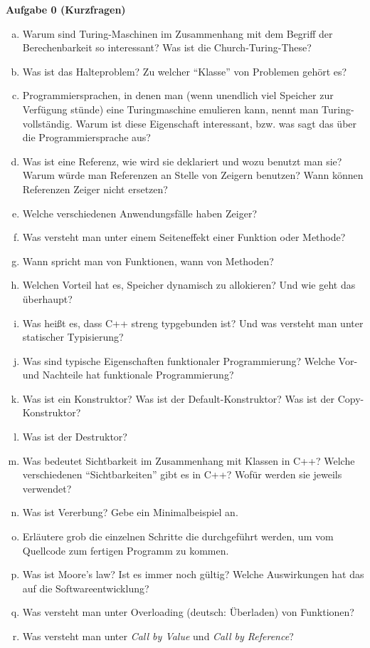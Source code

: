 \documentclass[a4paper,12pt]{article}
\newcommand{\Aufgabe}[1]{
  {
    \vspace*{0.5cm}
    \textsf{\textbf{Aufgabe #1}}
    \vspace*{0.2cm}
    
  }
}
\begin{document}
\Aufgabe{0 (Kurzfragen)}
\begin{enumerate}[a)]
\item Warum sind Turing-Maschinen im Zusammenhang mit dem Begriff der Berechenbarkeit so interessant? Was ist die Church-Turing-These?
\item Was ist das Halteproblem? Zu welcher ``Klasse'' von Problemen gehört es?
\item Programmiersprachen, in denen man (wenn unendlich viel Speicher zur Verfügung stünde) eine Turingmaschine emulieren kann, nennt man Turing-vollständig. Warum ist diese Eigenschaft interessant, bzw. was sagt das über die Programmiersprache aus?
\item Was ist eine Referenz, wie wird sie deklariert und wozu benutzt man sie? Warum würde man Referenzen an Stelle von Zeigern benutzen? Wann können Referenzen Zeiger nicht ersetzen?
\item Welche verschiedenen Anwendungsfälle haben Zeiger?
\item Was versteht man unter einem Seiteneffekt einer Funktion oder Methode?
\item Wann spricht man von Funktionen, wann von Methoden?
\item Welchen Vorteil hat es, Speicher dynamisch zu allokieren? Und wie geht das überhaupt?
\item Was heißt es, dass C++ streng typgebunden ist? Und was versteht man unter statischer Typisierung?
\item Was sind typische Eigenschaften funktionaler Programmierung? Welche Vor- und Nachteile hat funktionale Programmierung?
\item Was ist ein Konstruktor? Was ist der Default-Konstruktor? Was ist der Copy-Konstruktor?
\item Was ist der Destruktor?
\item Was bedeutet Sichtbarkeit im Zusammenhang mit Klassen in C++? Welche verschiedenen ``Sichtbarkeiten'' gibt es in C++? Wofür werden sie jeweils verwendet?
\item Was ist Vererbung? Gebe ein Minimalbeispiel an.
\item Erläutere grob die einzelnen Schritte die durchgeführt werden, um vom Quellcode zum fertigen Programm zu kommen.
\item Was ist Moore's law? Ist es immer noch gültig? Welche Auswirkungen hat das auf die Softwareentwicklung?
\item Was versteht man unter Overloading (deutsch: Überladen) von Funktionen?
\item Was versteht man unter \emph{Call by Value} und \emph{Call by Reference}?

\end{enumerate}
\end{document}
